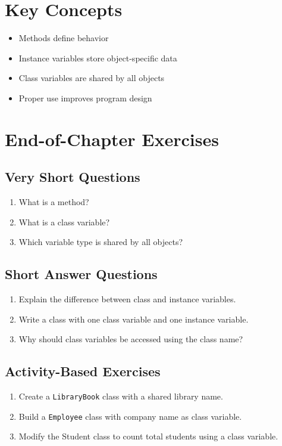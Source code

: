 \section{Key Concepts}

\begin{itemize}
    \item Methods define behavior
    \item Instance variables store object-specific data
    \item Class variables are shared by all objects
    \item Proper use improves program design
\end{itemize}

\section{End-of-Chapter Exercises}

\subsection{Very Short Questions}

\begin{enumerate}
    \item What is a method?
    \item What is a class variable?
    \item Which variable type is shared by all objects?
\end{enumerate}

\subsection{Short Answer Questions}

\begin{enumerate}
    \item Explain the difference between class and instance variables.
    \item Write a class with one class variable and one instance variable.
    \item Why should class variables be accessed using the class name?
\end{enumerate}

\subsection{Activity-Based Exercises}

\begin{enumerate}
    \item Create a \texttt{LibraryBook} class with a shared library name.
    \item Build a \texttt{Employee} class with company name as class variable.
    \item Modify the Student class to count total students using a class variable.
\end{enumerate}

